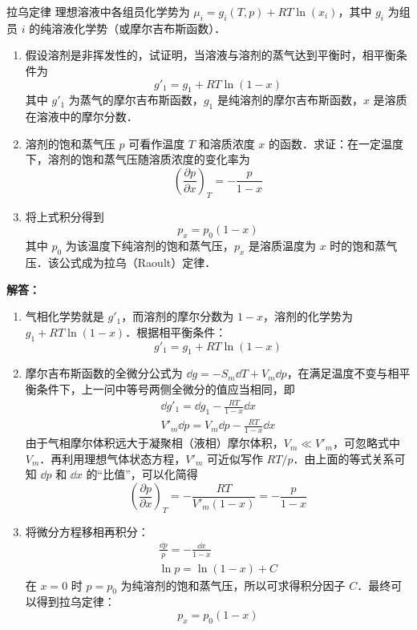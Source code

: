 \begin{example}{拉乌定律}
理想溶液中各组员化学势为 $\mu_i=g_i(T,p)+RT\ln(x_i)$，其中 $g_i$ 为组员 $i$ 的纯溶液化学势（或摩尔吉布斯函数）．
\begin{enumerate}
\item 假设溶剂是非挥发性的，试证明，当溶液与溶剂的蒸气达到平衡时，相平衡条件为
\begin{equation}
g'_1=g_1+RT\ln(1-x)
\end{equation}
其中 $g'_1$ 为蒸气的摩尔吉布斯函数，$g_1$ 是纯溶剂的摩尔吉布斯函数，$x$ 是溶质在溶液中的摩尔分数．
\item 溶剂的饱和蒸气压 $p$ 可看作温度 $T$ 和溶质浓度 $x$ 的函数．求证：在一定温度下，溶剂的饱和蒸气压随溶质浓度的变化率为
\begin{equation}
\left(\frac{\partial p}{\partial x}\right)_T=-\frac{p}{1-x}
\end{equation}
\item 将上式积分得到
\begin{equation}
p_x=p_0(1-x)
\end{equation}
其中 $p_0$ 为该温度下纯溶剂的饱和蒸气压，$p_x$ 是溶质温度为 $x$ 时的饱和蒸气压．该公式成为拉乌（Raoult）定律．
\end{enumerate}
\textbf{解答：}
\begin{enumerate}
\item 气相化学势就是 $g'_1$，而溶剂的摩尔分数为 $1-x$，溶剂的化学势为$g_1+RT\ln(1-x)$．根据相平衡条件：
\begin{equation}
g'_1=g_1+RT\ln(1-x)
\end{equation}
\item 摩尔吉布斯函数的全微分公式为 $\dd g=-S_m\dd T+V_m\dd p$，在满足温度不变与相平衡条件下，上一问中等号两侧全微分的值应当相同，即
\begin{equation}
\begin{aligned}
\dd g'_1=\dd g_1-\frac{RT}{1-x}\dd x\\
V'_m\dd p=V_m\dd p-\frac{RT}{1-x}\dd x
\end{aligned}
\end{equation}
由于气相摩尔体积远大于凝聚相（液相）摩尔体积，$V_m\ll V'_m$，可忽略式中 $V_m$．再利用理想气体状态方程，$V'_m$ 可近似写作 $RT/p$．由上面的等式关系可知 $\dd p$ 和 $\dd x$ 的“比值”，可以化简得
\begin{equation}
\left(\frac{\partial p}{\partial x}\right)_T=-\frac{RT}{V'_m(1-x)}=-\frac{p}{1-x}
\end{equation}
\item 将微分方程移相再积分：
\begin{equation}
\begin{aligned}
\frac{\dd p}{p}=-\frac{\dd x}{1-x}\\
\ln p=\ln(1-x)+C
\end{aligned}
\end{equation}
在 $x=0$ 时 $p=p_0$ 为纯溶剂的饱和蒸气压，所以可求得积分因子 $C$．最终可以得到拉乌定律：
\begin{equation}
p_x=p_0(1-x)
\end{equation}
\end{enumerate}
\end{example}

